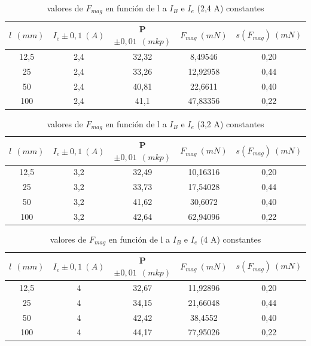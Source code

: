 \documentclass[12pt,a4paper]{book}
\begin{document}
\begin{table}[h!]
\begin{center}
\begin{tabular}{|c|c|c|c|c|}
\hline
$ l \ \ (mm) $ & 	 $ I_e \pm 0,1 \ (A) $ & 	 P$\pm 0,01\ \ (mkp)$ & 	 $F_{mag} \ (mN)$ & 	 $s(F_{mag}) \ (mN)$ \\ \hline
12,5 & 	 2,4 & 	 32,32 & 	 8,49546 & 	 0,20 \\ 
25 & 	 2,4 & 	 33,26 & 	 12,92958 & 	 0,44 \\ 
50 & 	 2,4 & 	 40,81 & 	 22,6611 & 	 0,40 \\ 
100 & 	 2,4 & 	 41,1 & 	 47,83356 & 	 0,22 \\ 
\hline
\end{tabular}
\label{Tab: Fmag vs l a Ie=2,4A balanza}
\caption{valores de $F_{mag}$ en función de l a $I_B$ e $I_e$ (2,4 A) constantes}
\end{center}
\end{table}


\begin{table}[h!]
\begin{center}
\begin{tabular}{|c|c|c|c|c|}
\hline
$ l \ \ (mm) $ & 	 $ I_e \pm 0,1 \ (A) $ & 	 P$\pm 0,01\ \ (mkp)$ & 	 $F_{mag} \ (mN)$ & 	 $s(F_{mag}) \ (mN)$ \\ \hline
12,5 & 	 3,2 & 	 32,49 & 	 10,16316 & 	 0,20 \\ 
25 & 	 3,2 & 	 33,73 & 	 17,54028 & 	 0,44 \\ 
50 & 	 3,2 & 	 41,62 & 	 30,6072 & 	 0,40 \\ 
100 & 	 3,2 & 	 42,64 & 	 62,94096 & 	 0,22 \\ 
\hline
\end{tabular}
\label{Tab: Fmag vs l a Ie=3,2A balanza}
\caption{valores de $F_{mag}$ en función de l a $I_B$ e $I_e$ (3,2 A) constantes}
\end{center}
\end{table}


\begin{table}[h!]
\begin{center}
\begin{tabular}{|c|c|c|c|c|}
\hline
$ l \ \ (mm) $ & 	 $ I_e \pm 0,1 \ (A) $ & 	 P$\pm 0,01\ \ (mkp)$ & 	 $F_{mag} \ (mN)$ & 	 $s(F_{mag}) \ (mN)$ \\ \hline 
12,5 & 	 4 & 	 32,67 & 	 11,92896 & 	 0,20 \\ 
25 & 	 4 & 	 34,15 & 	 21,66048 & 	 0,44 \\ 
50 & 	 4 & 	 42,42 & 	 38,4552 & 	 0,40 \\ 
100 & 	 4 & 	 44,17 & 	 77,95026 & 	 0,22 \\ 
\hline
\end{tabular}
\label{Tab: Fmag vs l a Ie=4A balanza}
\caption{valores de $F_{mag}$ en función de l a $I_B$ e $I_e$ (4 A) constantes}
\end{center}
\end{table}
\end{document}
